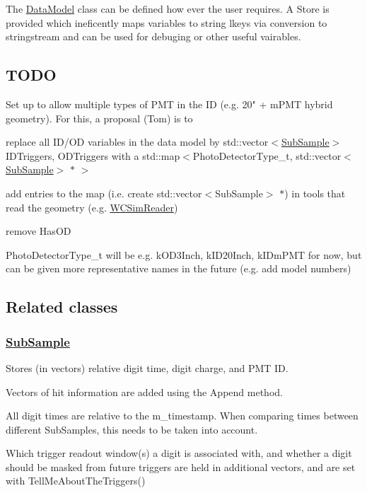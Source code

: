 The \hyperlink{classDataModel}{Data\-Model} class can be defined how ever the user requires. A Store is provided which ineficently maps variables to string lkeys via conversion to stringstream and can be used for debuging or other useful vairables.

\subsection*{T\-O\-D\-O}

Set up to allow multiple types of P\-M\-T in the I\-D (e.\-g. 20" + m\-P\-M\-T hybrid geometry). For this, a proposal (Tom) is to
\begin{DoxyItemize}
\item replace all I\-D/\-O\-D variables in the data model by {\ttfamily std\-::vector$<$\hyperlink{classSubSample}{Sub\-Sample}$>$ I\-D\-Triggers, O\-D\-Triggers} with a {\ttfamily std\-::map$<$Photo\-Detector\-Type\-\_\-t, std\-::vector$<$\hyperlink{classSubSample}{Sub\-Sample}$>$ $\ast$ $>$}
\item add entries to the map (i.\-e. create std\-::vector$<$\-Sub\-Sample$>$ $\ast$) in tools that read the geometry (e.\-g. {\ttfamily \hyperlink{classWCSimReader}{W\-C\-Sim\-Reader}})
\item remove {\ttfamily Has\-O\-D}
\item Photo\-Detector\-Type\-\_\-t will be e.\-g. k\-O\-D3\-Inch, k\-I\-D20\-Inch, k\-I\-Dm\-P\-M\-T for now, but can be given more representative names in the future (e.\-g. add model numbers)
\end{DoxyItemize}

\subsection*{Related classes}

\subsubsection*{\hyperlink{classSubSample}{Sub\-Sample}}

Stores (in vectors) relative digit time, digit charge, and P\-M\-T I\-D.

Vectors of hit information are added using the {\ttfamily Append} method.

All digit times are relative to the {\ttfamily m\-\_\-timestamp}. When comparing times between different Sub\-Samples, this needs to be taken into account.

Which trigger readout window(s) a digit is associated with, and whether a digit should be masked from future triggers are held in additional vectors, and are set with {\ttfamily Tell\-Me\-About\-The\-Triggers()}

